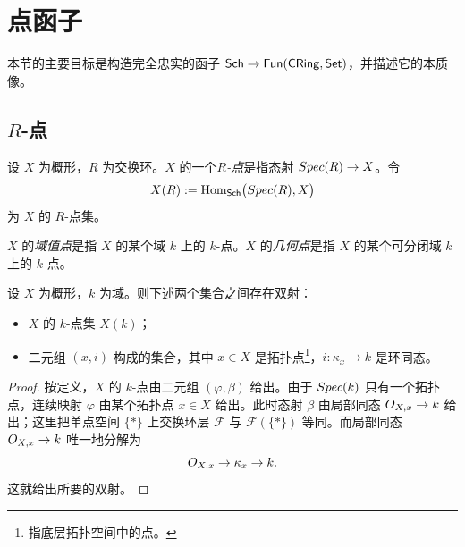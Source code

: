 
\makeatletter
{}
\makeatother

\section{点函子}\label{sec:8}

本节的主要目标是构造完全忠实的函子 $\mathsf{Sch}\to\mathsf{Fun}(\mathsf{CRing},\mathsf{Set})$，并描述它的本质像。

\subsection{\texorpdfstring{$R$}{R}-点}\label{sec:8.1}

\begin{definition}\label{def:8.1.1}
设 $X$ 为概形，$R$ 为交换环。$X$ 的一个\emph{$R$-点}是指态射 $Spec(R)\to X$。令
\[
X(R):=\operatorname{Hom}_{\mathsf{Sch}}\bigl(Spec(R),X\bigr)
\]
为 $X$ 的 $R$-点集。

$X$ 的\emph{域值点}是指 $X$ 的某个域 $k$ 上的 $k$-点。$X$ 的\emph{几何点}是指 $X$ 的某个可分闭域 $k$ 上的 $k$-点。
\end{definition}

\begin{propcon}\label{prop:8.1.2}
设 $X$ 为概形，$k$ 为域。则下述两个集合之间存在双射：
\begin{itemize}[leftmargin=1.6em,itemsep=0.2ex]
  \item $X$ 的 $k$-点集 $X(k)$；
  \item 二元组 $(x,i)$ 构成的集合，其中 $x\in X$ 是拓扑点\footnote{指底层拓扑空间中的点。}，$i:\kappa_x\to k$ 是环同态。
\end{itemize}
\end{propcon}

\begin{proof}
按定义，$X$ 的 $k$-点由二元组 $(\varphi,\beta)$ 给出。由于 $Spec(k)$ 只有一个拓扑点，连续映射 $\varphi$ 由某个拓扑点 $x\in X$ 给出。此时态射 $\beta$ 由局部同态 $O_{X,x}\to k$ 给出；这里把单点空间 $\{*\}$ 上交换环层 $\mathcal F$ 与 $\mathcal F(\{*\})$ 等同。而局部同态 $O_{X,x}\to k$ 唯一地分解为
\[
O_{X,x}\to\kappa_x\to k .
\]
这就给出所要的双射。
\end{proof}

